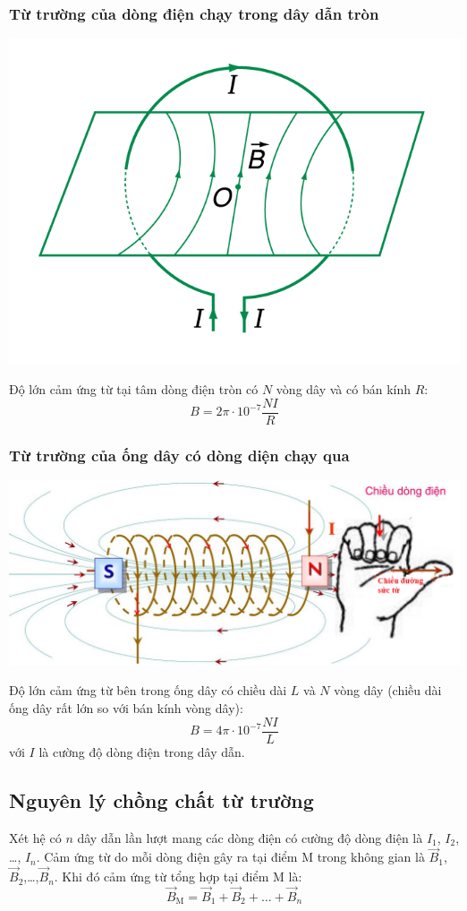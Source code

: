 \subsubsection{Từ trường của dòng điện chạy trong dây dẫn tròn}
\begin{center}
	\includegraphics[width=0.4\linewidth]{../figs/VN12-Y24-PH-SYL-019-1}
\end{center}
Độ lớn cảm ứng từ tại tâm dòng điện tròn có $N$ vòng dây và có bán kính $R$:
\begin{equation}
	B=2\pi\cdot10^{-7}\dfrac{NI}{R}
\end{equation}
\subsubsection{Từ trường của ống dây có dòng diện chạy qua}
\begin{center}
	\includegraphics[width=0.6\linewidth]{../figs/VN12-Y24-PH-SYL-019-2}
\end{center}
Độ lớn cảm ứng từ bên trong ống dây có chiều dài $L$ và $N$ vòng dây (chiều dài ống dây rất lớn so với bán kính vòng dây):
\begin{equation}
	B=4\pi \cdot10^{-7}\dfrac{NI}{L}
\end{equation}
với $I$ là cường độ dòng điện trong dây dẫn.
\subsection{Nguyên lý chồng chất từ trường}
Xét hệ có $n$ dây dẫn lần lượt mang các dòng điện có cường độ dòng điện là $I_1$, $I_2$, \dots, $I_n$. Cảm ứng từ do mỗi dòng điện gây ra tại điểm M trong không gian là $\vec{B}_1$, $\vec{B}_2$,\dots,$\vec{B}_n$. Khi đó cảm ứng từ tổng hợp tại điểm M là:
\begin{equation}
	\vec{B}_\text{M}=\vec{B}_1+\vec{B}_2+\dots+\vec{B}_n
\end{equation}

